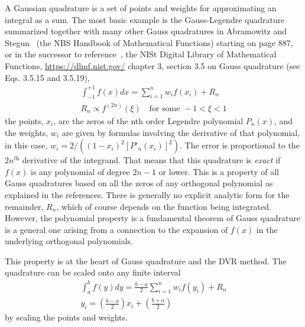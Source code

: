 \documentclass[aps,amssymb,superscriptaddress,floatfix]{revtex4}
\begin{document}
A Gaussian quadrature is a set of points and weights for approximating an integral as a sum.  The most basic example is the Gauss-Legendre quadrature summarized together with many other Gauss quadratures in Abramowitz and Stegun~\cite{abramowitz+stegun}  (the NBS Handbook of Mathematical Functions) starting on page 887, or in the successor to reference~\cite{abramowitz+stegun}, the NISt Digital Library of Mathematical Functions, \href{https://dlmf.nist.gov/}{https://dlmf.nist.gov/}  chapter 3, section 3.5 on Gauss quadrature (see Eqs. 3.5.15 and 3.5.19),
\begin{equation}
\begin{split}
\int_{-1}^{+1} f(x) dx = \sum_{i=1}^n w_i f(x_i) + R_n \\
R_n \propto f^{(2n)}(\xi)  \quad \textrm{for some } -1< \xi <1
\end{split}
\end{equation}
the points, $x_i$, are the zeros of the nth order Legendre polynomial $P_n(x)$, and the weights, $w_i$ are given by formulas involving the derivative of that polynomial, in this case, $w_i = 2/\left((1-x_i)^2 [P'_n(x_i)]^2 \right)$.  The error is proportional to the $2n^\textit{th}$ derivative of the integrand.  That means that this quadrature is \textit{exact} if $f(x)$ is any polynomial of degree $2n-1$ or lower.   This is a property of all Gauss quadratures based on all the zeros of any orthogonal polynomial as explained in the references.  There is generally no explicit analytic form for the remainder, $R_n$, which of course depends on the function being integrated.  However, the polynomial property is a fundamental theorem of Gauss quadrature is a general one arising from a connection to the expansion of $f(x)$ in the underlying orthogonal polynomials.

This property is at the heart of Gauss quadrature and the DVR method.
The quadrature can be scaled onto any finite interval
\begin{equation}
\begin{split}
\int_{a}^{b} f(y) dy = \frac{b-a}{2} \sum_{i=1}^n w_i f(y_i) + R_n \\
y_i = \left( \frac{b-a}{2} \right) x_i + \left( \frac{b+a}{2} \right)
\end{split}
\label{eq:GausLeg}
\end{equation}
by scaling the points and weights.
\end{document}
